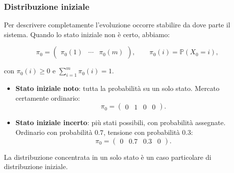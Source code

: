 \documentclass[handout]{beamer}%
\newenvironment{stepitemize}{\begin{itemize}[<+->]}{\end{itemize} }
\providecommand{\Prob}{\mathbb{P}}
\providecommand{\QTR}[2]{\csname #1\endcsname{#2}}
\begin{document}
\begin{frame}%
%

\frametitle{Distribuzione iniziale}%
%

%


Per descrivere completamente l'evoluzione occorre stabilire da dove parte il
sistema. Quando lo stato iniziale non \`{e} certo, abbiamo:%

\[
\pi_{0}=
\begin{pmatrix}
\pi_{0}(1) & \cdots & \pi_{0}(m)
\end{pmatrix}
, \qquad\pi_{0}(i)=\Prob(X_{0}=i),
\]


con $\pi_{0}(i)\geq0$ e $\sum_{i=1}^{m}\pi_{0}(i)=1$.

\medskip

\begin{stepitemize}


\item \textbf{Stato iniziale noto}: tutta la probabilit\`{a} su un solo stato.
Mercato certamente ordinario:
\[
\pi_{0}=
\begin{pmatrix}
0 & 1 & 0 & 0
\end{pmatrix}
.
\]


\item \textbf{Stato iniziale incerto}: pi\`{u} stati possibili, con
probabilit\`{a} assegnate. Ordinario con probabilit\`{a} $0.7$, tensione con
probabilit\`{a} $0.3$:
\[
\pi_{0}=
\begin{pmatrix}
0 & 0.7 & 0.3 & 0
\end{pmatrix}
.
\]

\end{stepitemize}

\medskip

\begin{center}
{\small La distribuzione concentrata in un solo stato \`{e} un caso
particolare di distribuzione iniziale.}
\end{center}%

\transboxout
\end{frame}%
\end{document}

